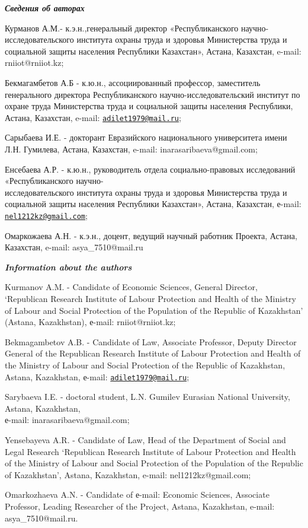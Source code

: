 \begin{authorinfo}

  \hspace{1em}\emph{{\bfseries Сведения об авторах}}

Курманов А.М.- к.э.н.,генеральный директор «Республиканского
научно-исследовательского института охраны труда и здоровья Министерства
труда и социальной защиты населения Республики Казахстан», Астана,
Казахстан, e-mail: rniiot@rniiot.kz;

Бекмагамбетов А.Б - к.ю.н., ассоциированный профессор, заместитель
генерального директора Республиканского научно-исследовательский
институт по охране труда Министерства труда и социальной защиты
населения Республики, Астана, Казахстан, e-mail:
\href{mailto:adilet1979@mail.ru}{\nolinkurl{adilet1979@mail.ru}};

Сарыбаева И.Е. - докторант Евразийского национального университета имени
Л.Н. Гумилева, Астана, Казахстан, e-mail: inarasaribaeva@gmail.com;

Енсебаева А.Р. - к.ю.н., руководитель отдела социально-правовых
исследований «Республиканского научно-\\исследовательского института
охраны труда и здоровья Министерства труда и социальной защиты населения
Республики Казахстан», Астана, Казахстан, е-mail:
\href{mailto:nel1212kz@gmail.com}{\nolinkurl{nel1212kz@gmail.com}};

Омаркожаева А.Н. - к.э.н., доцент, ведущий научный работник Проекта,
Астана, Казахстан, e-mail: asya\_7510@mail.ru

\hspace{1em}\emph{{\bfseries Information about the authors}}

Kurmanov A.M. - Candidate of Economic Sciences, General Director,
`Republican Research Institute of Labour Protection and Health of the
Ministry of Labour and Social Protection of the Population of the
Republic of Kazakhstan' (Astana, Kazakhstan), е-mail: rniiot@rniiot.kz;

Bekmagambetov A.B. - Candidate of Law, Associate Professor, Deputy
Director General of the Republican Research Institute of Labour
Protection and Health of the Ministry of Labour and Social Protection of
the Republic of Kazakhstan, Astana, Kazakhstan, е-mail:
\href{mailto:adilet1979@mail.ru}{\nolinkurl{adilet1979@mail.ru}};

Sarybaeva I.E. - doctoral student, L.N. Gumilev Eurasian National
University, Astana, Kazakhstan, \\е-mail: inarasaribaeva@gmail.com;

Yensebayeva A.R. - Candidate of Law, Head of the Department of Social
and Legal Research `Republican Research Institute of Labour Protection
and Health of the Ministry of Labour and Social Protection of the
Population of the Republic of Kazakhstan', Astana, Kazakhstan, e-mail:
nel1212kz@gmail.com;

Omarkozhaeva A.N. - Candidate of е-mail: Economic Sciences, Associate
Professor, Leading Researcher of the Project, Astana, Kazakhstan,
e-mail: asya\_7510@mail.ru.
\end{authorinfo}
